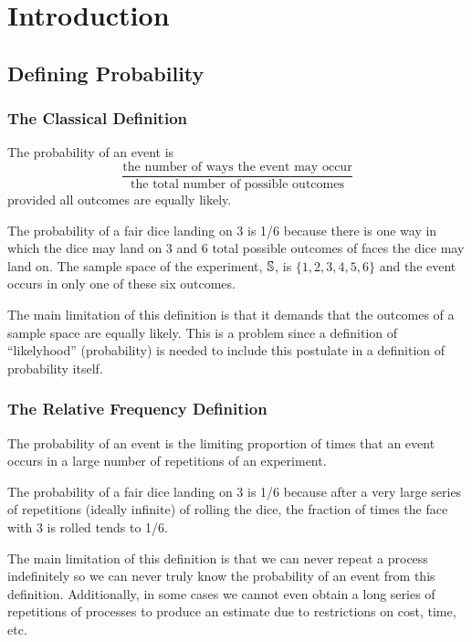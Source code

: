 \chapter{Introduction}
\section{Defining Probability}
\subsection*{The Classical Definition}
The probability of an event is
\[  
    \frac{\text{the number of ways the event may occur}}{\text{the total number of possible outcomes}}
\]
provided all outcomes are equally likely.
\begin{example}
The probability of a fair dice landing on 3 is 1/6 because there is one way in which the dice may land on 3 and 6 total possible outcomes of faces the dice may land on. The sample space of the experiment, $\mathbb{S}$, is $\{1,2,3,4,5,6\}$ and the event occurs in only one of these six outcomes.
\end{example}
\begin{info}
The main limitation of this definition is that it demands that the outcomes of a sample space are equally likely. This is a problem since a definition of ``likelyhood'' (probability) is needed to include this postulate in a definition of probability itself.
\end{info}
\subsection*{The Relative Frequency Definition}
The probability of an event is the limiting proportion of times that an event occurs in a large number of repetitions of an experiment.
\begin{example}
The probability of a fair dice landing on 3 is 1/6 because after a very large series of repetitions (ideally infinite) of rolling the dice, the fraction of times the face with 3 is rolled tends to 1/6.
\end{example}
\begin{info}
The main limitation of this definition is that we can never repeat a process indefinitely so we can never truly know the probability of an event from this definition. Additionally, in some cases we cannot even obtain a long series of repetitions of processes to produce an estimate due to restrictions on cost, time, etc.
\end{info}
